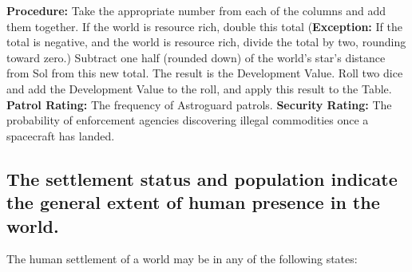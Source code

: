 \begin{table}[htbp]
{\begin{minipage}{0.95\textwidth}
      \medskip

      \parbox{\textwidth}{\textbf{Procedure:} Take the appropriate
        number from each of the columns and add them together. If the
        world is resource rich, double this total (\textbf{Exception:}
        If the total is negative, and the world is resource rich, divide
        the total by two, rounding toward zero.) Subtract one half
        (rounded down) of the world's star's distance from Sol from this
        new total.  The result is the Development Value. Roll two dice
        and add the Development Value to the roll, and apply this result
        to the Table. \textbf{Patrol Rating:} The frequency of
        Astroguard patrols. \textbf{Security Rating:} The probability of
        enforcement agencies discovering illegal commodities once a
        spacecraft has landed.}
    \end{minipage}}
\end{table}

\subsection[Settlement Status]{The settlement status and population
  indicate the general extent of human presence in the world.}
\label{sec:settlement-status}

The human settlement of a world may be in any of the following states: 

